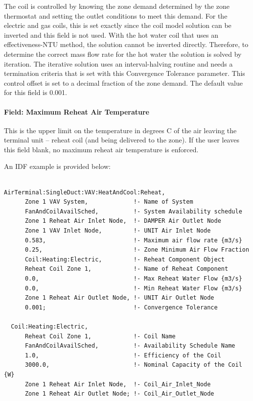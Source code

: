 The coil is controlled by knowing the zone demand determined by the zone thermostat and setting the outlet conditions to meet this demand. For the electric and gas coils, this is set exactly since the coil model solution can be inverted and this field is not used. With the hot water coil that uses an effectiveness-NTU method, the solution cannot be inverted directly. Therefore, to determine the correct mass flow rate for the hot water the solution is solved by iteration. The iterative solution uses an interval-halving routine and needs a termination criteria that is set with this Convergence Tolerance parameter. This control offset is set to a decimal fraction of the zone demand. The default value for this field is 0.001.

\paragraph{Field: Maximum Reheat Air Temperature}\label{field-maximum-reheat-air-temperature-2}

This is the upper limit on the temperature in degrees C of the air leaving the terminal unit -- reheat coil (and being delivered to the zone). If the user leaves this field blank, no maximum reheat air temperature is enforced.

An IDF example is provided below:

\begin{lstlisting}

AirTerminal:SingleDuct:VAV:HeatAndCool:Reheat,
      Zone 1 VAV System,             !- Name of System
      FanAndCoilAvailSched,          !- System Availability schedule
      Zone 1 Reheat Air Inlet Node,  !- DAMPER Air Outlet Node
      Zone 1 VAV Inlet Node,         !- UNIT Air Inlet Node
      0.583,                         !- Maximum air flow rate {m3/s}
      0.25,                          !- Zone Minimum Air Flow Fraction
      Coil:Heating:Electric,         !- Reheat Component Object
      Reheat Coil Zone 1,            !- Name of Reheat Component
      0.0,                           !- Max Reheat Water Flow {m3/s}
      0.0,                           !- Min Reheat Water Flow {m3/s}
      Zone 1 Reheat Air Outlet Node, !- UNIT Air Outlet Node
      0.001;                         !- Convergence Tolerance

  Coil:Heating:Electric,
      Reheat Coil Zone 1,            !- Coil Name
      FanAndCoilAvailSched,          !- Availability Schedule Name
      1.0,                           !- Efficiency of the Coil
      3000.0,                        !- Nominal Capacity of the Coil {W}
      Zone 1 Reheat Air Inlet Node,  !- Coil_Air_Inlet_Node
      Zone 1 Reheat Air Outlet Node; !- Coil_Air_Outlet_Node
\end{lstlisting}

